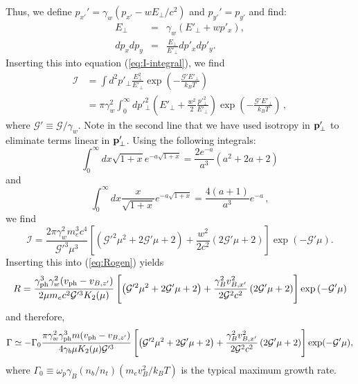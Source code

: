 \documentclass[usenatbib,iop,apj]{emulateapj}
\newcommand\qc[1]{{\color{red} \bf #1}}
\newcommand\bmath[1] {\mbox{\boldmath$\rm #1$}}
\def\bp{\bmath{p}}
\def\gph{\gamma_{\rm ph}}
\def\vph{v_{\rm ph}}
\def\cG{\mathcal{G}}
\newcommand{\kI}{\ensuremath{\mathcal{I}}}
\begin{document}
Thus, we define $p_{x'}'=\gamma_w(p_{x'}-w E_\perp/c^2)$ and $p_{y'}'=p_{y'}$ and find:
\begin{eqnarray}
E_\perp &=& \gamma_w(E'_\perp + w p'_x),\\
d p_x d p_y &=& \frac{E_\perp}{E'_\perp} d p'_x d p'_y.
\end{eqnarray}
Inserting this into equation (\ref{eq:I-integral}), we find
\begin{equation}
\begin{aligned}
\kI &= 
\int d^2\!p'_\perp \frac{E_\perp^2}{E'_\perp} \exp\left(-\frac{\cG'E'_\perp}{k_B T}\right)\\
&=
\pi \gamma_w^2 \int_0^\infty dp'^2_\perp \left(
  E'_\perp + \frac{w^2}{2} \frac{p'^2_\perp}{E'_\perp}
\right) \exp\left(-\frac{\cG'E'_\perp}{k_B T}\right)\,,
\end{aligned}
\end{equation}
where $\cG'\equiv\cG/\gamma_w$. Note in the second line that we have used isotropy in $\bp_{\perp}'$ to eliminate terms linear in $\bp_{\perp}'$. 
Using the following integrals: 
\begin{equation}
\int_0^\infty dx \sqrt{1+x} e^{-a\sqrt{1+x}} = \frac{2 e^{-a}}{a^3}\left(a^2 + 2a + 2\right)
\end{equation}
and 
\begin{equation}
\int_0^\infty dx \frac{x}{\sqrt{1+x}} e^{-a\sqrt{1+x}}
=
\frac{4(a+1)}{a^3} e^{-a}\,,
\end{equation}
we find
\begin{equation}
\kI =
\frac{2 \pi \gamma_w^2 m_e^3c^4}{\cG'^3\mu^3} \left[
\left(\cG'^2\mu^2+2\cG'\mu+2\right)
+
\frac{w^2}{2c^2}
\left(2\cG'\mu+2\right)
\right]\exp\left(-\cG'\mu\right).
\end{equation}
Inserting this into (\ref{eq:Rogen}) yields
\begin{equation}
R = \frac{
  \gph^3 \gamma_w^2 (\vph-v_{B,z'}) 
}{ 2 \mu m_ec^2 \cG'^3 K_2(\mu)}
\left[
\left(\cG'^2\mu^2 + 2\cG'\mu + 2\right)
+
\frac{\gamma_B^2 v_{B,x'}^2}{2\cG^2 c^2} \left(2 \cG'\mu + 2\right)
\right] \exp\left(-\cG'\mu\right)
\end{equation}
and therefore,
\begin{equation}
\Gamma \simeq - \Gamma_0
\frac{\pi \gamma_w^2 \gph^3 m (\vph-v_{B,z'})}{4 \gamma_b \mu K_2(\mu) \cG'^3}
\left[
\left( \cG'^2\mu^2 + 2\cG'\mu + 2 \right) 
+
\frac{\gamma_B^2 v_{B,x'}^2}{2\cG^2c^2} \left(2 \cG'\mu+ 2\right)
\right]
\exp(-\cG'\mu),
\label{eq:OGgen}
\end{equation}
where $\Gamma_0 \equiv \omega_p \gamma_B (n_b/n_t) (m_e v_B^2/k_B T)$ is the typical maximum growth rate.
\end{document}
